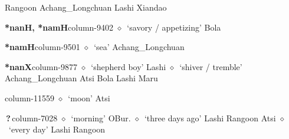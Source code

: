          Rangoon 
\hspace{1ex}
         Achang\_Longchuan 
\hspace{1ex}
         Lashi 
\hspace{1ex}
         Xiandao 
  \item {\footnotesize \textbf{*nanH, *namH}}{\tiny column-9402}
         $\diamond$~`savory / appetizing'
         Bola 
  \item {\footnotesize \textbf{*namH}}{\tiny column-9501}
         $\diamond$~`sea'
         Achang\_Longchuan 
  \item {\footnotesize \textbf{*nanX}}{\tiny column-9877}
         $\diamond$~`shepherd boy'
         Lashi 
\hspace{1ex}
         $\diamond$~`shiver / tremble'
         Achang\_Longchuan 
\hspace{1ex}
         Atsi 
\hspace{1ex}
         Bola 
\hspace{1ex}
         Lashi 
\hspace{1ex}
         Maru 
  \item {\footnotesize \textbf{}}{\tiny column-11559}
         $\diamond$~`moon'
         Atsi 
  \item {\footnotesize \textbf{\,?\,}}{\tiny column-7028}
         $\diamond$~`morning'
         OBur. 
\hspace{1ex}
         $\diamond$~`three days ago'
         Lashi 
\hspace{1ex}
         Rangoon 
\hspace{1ex}
         Atsi 
\hspace{1ex}
         $\diamond$~`every day'
         Lashi 
\hspace{1ex}
         Rangoon 
